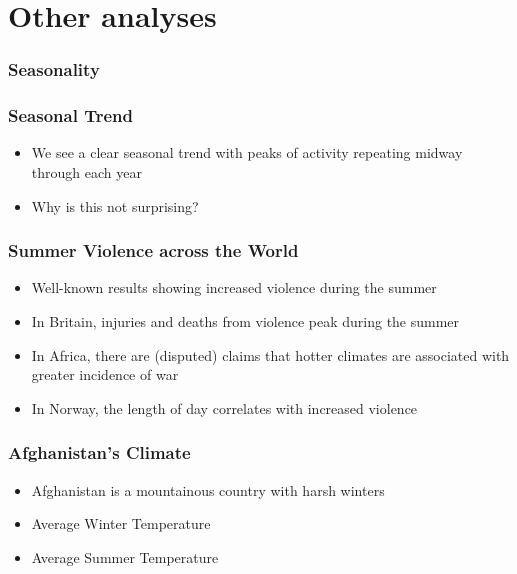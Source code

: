 \documentclass[xcolor=dvipsnames, 9pt]{beamer}
\begin{document}

\section{Other analyses} %
\label{sec:other_analyses}

\begin{frame}[fragile]
  \frametitle{Seasonality}
  \begin{center}
  \end{center}
\end{frame}

\begin{frame}[fragile]
  \frametitle{Seasonal Trend}
  \begin{itemize}
    \item{We see a clear seasonal trend with peaks of activity repeating midway through each year}
    \item{Why is this not surprising?}
  \end{itemize}
\end{frame}

\begin{frame}[fragile]
  \frametitle{Summer Violence across the World}
  \begin{itemize}
    \item{Well-known results showing increased violence during the summer}
    \item{In Britain, injuries and deaths from violence peak during the summer}
    \item{In Africa, there are (disputed) claims that hotter climates are associated with greater incidence of war}
    \item{In Norway, the length of day correlates with increased violence}
  \end{itemize}
\end{frame}

\begin{frame}[fragile]
  \frametitle{Afghanistan's Climate}
  \begin{itemize}
    \item{Afghanistan is a mountainous country with harsh winters}
    \item{Average Winter Temperature}
    \item{Average Summer Temperature}
  \end{itemize}
\end{frame}

\end{document}
